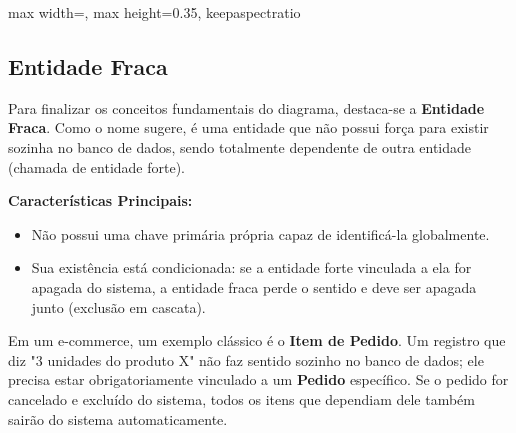 \begin{diagramER}
\begin{center}
    \vspace{0.5cm}
    
    \begin{adjustbox}{max width=\linewidth, max height=0.35\textheight, keepaspectratio}
\end{adjustbox}
    
    \end{center}
\end{diagramER}

\subsection{Entidade Fraca}

Para finalizar os conceitos fundamentais do diagrama, destaca-se a \textbf{Entidade Fraca}. Como o nome sugere, é uma entidade que não possui força para existir sozinha no banco de dados, sendo totalmente dependente de outra entidade (chamada de entidade forte).

\textbf{Características Principais:}
\begin{itemize}
    \item Não possui uma chave primária própria capaz de identificá-la globalmente.
    \item Sua existência está condicionada: se a entidade forte vinculada a ela for apagada do sistema, a entidade fraca perde o sentido e deve ser apagada junto (exclusão em cascata).
\end{itemize}

Em um e-commerce, um exemplo clássico é o \textbf{Item de Pedido}. Um registro que diz "3 unidades do produto X" não faz sentido sozinho no banco de dados; ele precisa estar obrigatoriamente vinculado a um \textbf{Pedido} específico. Se o pedido for cancelado e excluído do sistema, todos os itens que dependiam dele também sairão do sistema automaticamente.

